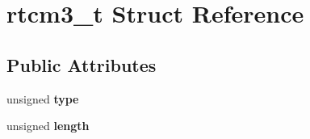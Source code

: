 \hypertarget{structrtcm3__t}{\section{rtcm3\-\_\-t \-Struct \-Reference}
\label{structrtcm3__t}
}
\subsection*{\-Public \-Attributes}
\begin{DoxyCompactItemize}
\item 
\hypertarget{structrtcm3__t_a9c0492c16cbc2ac385f01659be324ead}{unsigned {\bfseries type}}\label{structrtcm3__t_a9c0492c16cbc2ac385f01659be324ead}

\item 
\hypertarget{structrtcm3__t_abdafba865624fb1e1dfb8eddba32ca16}{unsigned {\bfseries length}}\label{structrtcm3__t_abdafba865624fb1e1dfb8eddba32ca16}


\end{DoxyCompactItemize}
